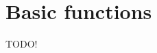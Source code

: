 \documentclass[usenames,dvipsnames]{beamer}
\begin{document}
\section{Basic functions}

\begin{frame}
TODO!
\end{frame}
\end{document}
